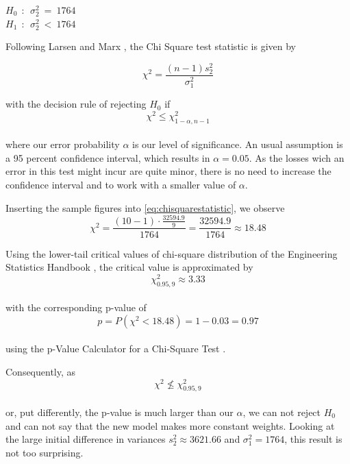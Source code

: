 \begin{center}
$H_0~~:~~ \sigma^2_2~=~1764$\\ 
$H_1~~:~~ \sigma^2_2~<~1764$
\end{center}

Following Larsen and Marx \cite[Chapter 7.5]{larsen2005introduction}, the Chi Square test statistic is given by 

\begin{equation}
\chi^2 = \frac{(n-1)s_2^2}{\sigma_1^2}
\label{eq:chisquarestatistic}
\end{equation}

with the decision rule of rejecting $H_0$ if 
\\
\begin{equation}
\chi^2 \leq \chi^2_{1-\alpha,n-1}
\label{eq:decisionrule}
\end{equation}
\\
where our error probability $\alpha$ is our level of significance. An usual assumption is a 95 percent confidence interval, which results in $\alpha = 0.05$. As the losses wich an error in this test might incur are quite minor, there is no need to increase the confidence interval and to work with a smaller value of $\alpha$.


Inserting the sample figures into \ref{eq:chisquarestatistic}, we observe 
\begin{equation}
\chi^2 = \frac{(10-1) \cdot \frac{32594.9}{9}}{1764} = \frac{32594.9}{1764} \approx 18.48
\label{eq:chisqstatcalc}
\end{equation}

Using the lower-tail critical values of chi-square distribution of the Engineering Statistics Handbook \cite{nist}, the critical value is approximated by 
\\
\begin{equation}
\chi^2_{0.95,9}\approx 3.33
\label{eq:criticalvalue}
\end{equation}
\\
with the corresponding p-value of
\\
\begin{equation}
p = P(\chi^2 < 18.48) = 1-0.03 = 0.97
\label{eq:pvalue}
\end{equation}
\\
using the p-Value Calculator for a Chi-Square Test \cite{freepvalue}. 

Consequently, as 
\\
\begin{equation}
\chi^2 \nleq \chi^2_{0.95,9}
\label{eq:criticalvalue}
\end{equation}
\\
or, put differently, the p-value is much larger than our $\alpha$, we can not reject $H_0$ and can not say that the new model makes more constant weights. Looking at the large initial difference in variances $s_2^2 \approx 3621.66 $ and $\sigma^2_1 = 1764$, this result is not too surprising. 




